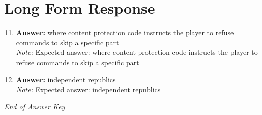 \documentclass[12pt]{article}
\begin{document}
\section*{Long Form Response}
\begin{enumerate}[label=\arabic*.]
\setcounter{enumi}{10}
\item \textbf{Answer:} where content protection code instructs the player to refuse commands to skip a specific part
\\ \textit{Note:} Expected answer: where content protection code instructs the player to refuse commands to skip a specific part
\item \textbf{Answer:} independent republics
\\ \textit{Note:} Expected answer: independent republics
\end{enumerate}

\vfill
\noindent\textit{End of Answer Key}
\end{document}
